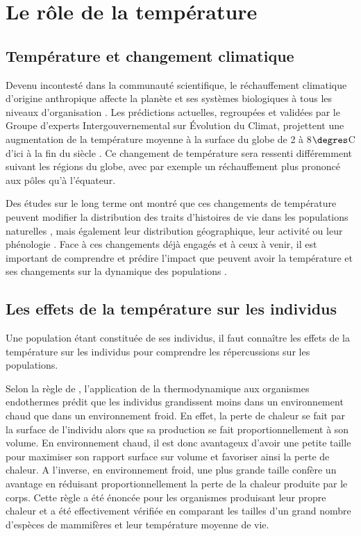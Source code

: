 \section{Le rôle de la température}

\subsection{Température et changement climatique}

Devenu incontesté dans la communauté scientifique, le réchauffement climatique
d'origine anthropique affecte la planète et ses systèmes biologiques à tous les
niveaux d'organisation \autocites{sagarin1999a,sala2000a,ipcc2007a,walther2002a}. Les
prédictions actuelles, regroupées et validées par le Groupe d’experts
Intergouvernemental sur \'{E}volution du Climat, projettent une augmentation de
la température moyenne à la surface du globe de 2 à 8$\degres$C d'ici à la fin
du siècle \autocites{ipcc2007a}. Ce changement de température sera ressenti
différemment suivant les régions du globe, avec par exemple un réchauffement
plus prononcé aux pôles qu'à l'équateur. 

Des études sur le long terme ont montré que ces changements de température
peuvent modifier la distribution des traits d'histoires de vie dans les
populations naturelles \autocites{parmesan2006a,ozgul2009a}, mais également leur
distribution géographique, leur activité ou leur phénologie
\autocites{parmesan2006a,walther2002a}.
Face à ces changements déjà engagés et à ceux à venir, il est important de
comprendre et prédire l'impact que peuvent avoir la température et ses
changements sur la dynamique des populations \autocite{lavergne2010a}. 

\subsection{Les effets de la température sur les individus}

Une population étant constituée de ses individus, il faut connaître les effets
de la température sur les individus pour comprendre les répercussions sur les
populations. 

Selon la règle de \textcites{bergmann1848a}, l'application de la thermodynamique
aux organismes endothermes prédit que les individus grandissent moins dans un
environnement chaud que dans un environnement froid. En effet, la perte de
chaleur se fait par la surface de l'individu alors que sa production se fait
proportionnellement à son volume. En environnement chaud, il est donc avantageux
d'avoir une petite taille pour maximiser son rapport surface sur volume et
favoriser ainsi la perte de chaleur. A l'inverse, en environnement froid, une
plus grande taille confère un avantage en réduisant proportionnellement la perte
de la chaleur produite par le corps. Cette règle a été énoncée pour les organismes produisant
leur propre chaleur et a été effectivement vérifiée en comparant les tailles
d'un grand nombre d'espèces de mammifères et leur température moyenne de vie. 

